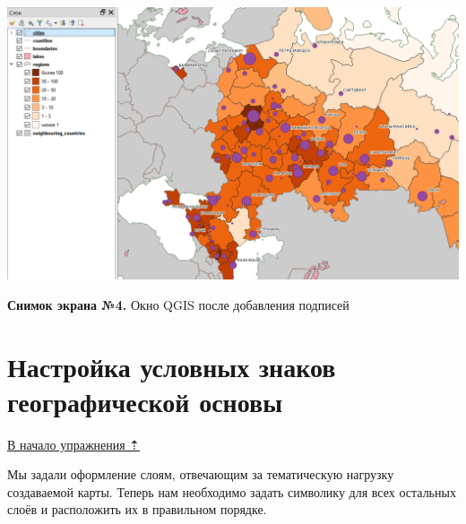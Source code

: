 \documentclass[
  12pt,
]{book}
\begin{document}
\includegraphics{images/Ex03/LabelResult.png}

\textbf{Снимок экрана №4.} Окно QGIS после добавления подписей

\hypertarget{map-design-population-basemap}{%
\section{Настройка условных знаков географической основы}\label{map-design-population-basemap}}

\protect\hyperlink{map-design-population}{В начало упражнения ⇡}

Мы задали оформление слоям, отвечающим за тематическую нагрузку создаваемой карты. Теперь нам необходимо задать символику для всех остальных слоёв и расположить их в правильном порядке.
\end{document}
